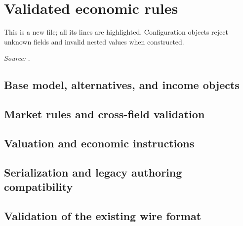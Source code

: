 \section{Validated economic rules}
This is a new file; all its lines are highlighted. Configuration objects reject unknown fields and invalid nested values when constructed.
\par\textit{Source:} .
\def\activefile{rules}
\subsection{Base model, alternatives, and income objects}

\subsection{Market rules and cross-field validation}

\subsection{Valuation and economic instructions}

\subsection{Serialization and legacy authoring compatibility}

\subsection{Validation of the existing wire format}

